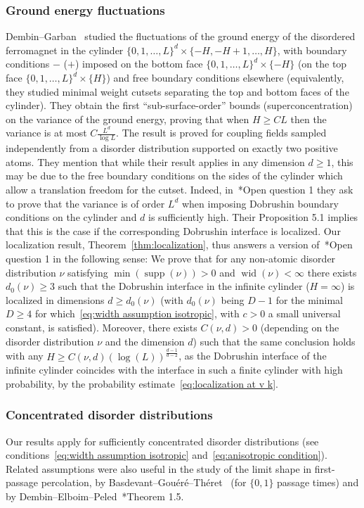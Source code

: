 \documentclass[11pt, reqno]{amsart}
\DeclareMathOperator{\supp}{supp}
\DeclareMathOperator{\wid}{wid}
\numberwithin{equation}{section}
\begin{document}
\subsubsection{Ground energy fluctuations}\label{sec:ground energy fluctuations} Dembin--Garban~\cite{DG23} studied the fluctuations of the ground energy of the disordered ferromagnet in the cylinder $\{0,1,\ldots,L\}^d\times\{-H,{-H+1},\ldots, H\}$, with boundary conditions $-$ ($+$) imposed on the bottom face $\{0,1,\ldots, L\}^d\times\{-H\}$ (on the top face $\{0,1,\ldots, L\}^d\times\{H\}$) and free boundary conditions elsewhere (equivalently, they studied minimal weight cutsets separating the top and bottom faces of the cylinder). They obtain the first ``sub-surface-order'' bounds (superconcentration) on the variance of the ground energy, proving that when $H\ge CL$ then the variance is at most $C\frac{L^d}{\log L}$. The result is proved for coupling fields sampled independently from a disorder distribution supported on exactly two positive atoms. They mention that while their result applies in any dimension $d\ge 1$, this may be due to the free boundary conditions on the sides of the cylinder which allow a translation freedom for the cutset. Indeed, in~\cite{DG23}*{Open question 1} they ask to prove that the variance is of order $L^d$ when imposing Dobrushin boundary conditions on the cylinder and $d$ is sufficiently high. Their Proposition 5.1 implies that this is the case if the corresponding Dobrushin interface is localized. Our localization result, Theorem~\ref{thm:localization}, thus answers a version of~\cite{DG23}*{Open question 1} in the following sense: We prove that for any non-atomic disorder distribution $\nu$ satisfying $\min(\supp(\nu))>0$ and $\wid(\nu)<\infty$ there exists $d_0(\nu)\ge 3$ such that the Dobrushin interface in the infinite cylinder ($H=\infty$) is localized in dimensions $d\ge d_0(\nu)$ (with $d_0(\nu)$ being $D-1$ for the minimal $D\ge 4$ for which~\eqref{eq:width assumption isotropic}, with $c>0$ a small universal constant, is satisfied). Moreover, there exists $C(\nu, d)>0$ (depending on the disorder distribution $\nu$ and the dimension $d$) such that the same conclusion holds with any $H\ge C(\nu,d)(\log (L))^{\frac{d-1}{d-2}}$, as the Dobrushin interface of the infinite cylinder coincides with the interface in such a finite cylinder with high probability, by the probability estimate~\eqref{eq:localization at v k}.

\subsubsection{Concentrated disorder distributions} Our results apply for sufficiently concentrated disorder distributions (see conditions~\eqref{eq:width assumption isotropic} and~\eqref{eq:anisotropic condition}). Related assumptions were also useful in the study of the limit shape in first-passage percolation, by Basdevant--Gou\'er\'e--Th\'eret~\cite{BGT22} (for $\{0,1\}$ passage times) and by Dembin--Elboim--Peled~\cite{DEP22}*{Theorem 1.5}.
\end{document}
